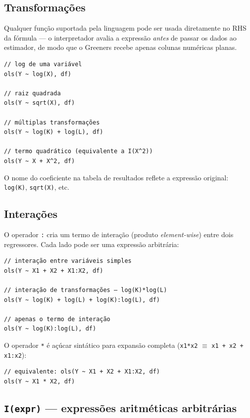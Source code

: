 \subsection{Transformações}
\label{subsec:formula-transformacoes}

Qualquer função suportada pela linguagem pode ser usada diretamente
no RHS da fórmula — o interpretador avalia a expressão
\emph{antes} de passar os dados ao estimador, de modo que o Greeners
recebe apenas colunas numéricas planas.

\begin{lstlisting}[caption={Transformações em regressores}]
// log de uma variável
ols(Y ~ log(X), df)

// raiz quadrada
ols(Y ~ sqrt(X), df)

// múltiplas transformações
ols(Y ~ log(K) + log(L), df)

// termo quadrático (equivalente a I(X^2))
ols(Y ~ X + X^2, df)
\end{lstlisting}

O nome do coeficiente na tabela de resultados reflete a expressão
original: \texttt{log(K)}, \texttt{sqrt(X)}, etc.

\subsection{Interações}
\label{subsec:formula-interacoes}

O operador \texttt{:} cria um termo de interação (produto
\emph{element-wise}) entre dois regressores. Cada lado pode ser uma
expressão arbitrária:

\begin{lstlisting}[caption={Interações}]
// interação entre variáveis simples
ols(Y ~ X1 + X2 + X1:X2, df)

// interação de transformações — log(K)*log(L)
ols(Y ~ log(K) + log(L) + log(K):log(L), df)

// apenas o termo de interação
ols(Y ~ log(K):log(L), df)
\end{lstlisting}

O operador \texttt{*} é açúcar sintático para expansão completa
(\texttt{x1*x2} $\equiv$ \texttt{x1 + x2 + x1:x2}):

\begin{lstlisting}
// equivalente: ols(Y ~ X1 + X2 + X1:X2, df)
ols(Y ~ X1 * X2, df)
\end{lstlisting}

\subsection{\texttt{I(expr)} — expressões aritméticas arbitrárias}
\label{subsec:formula-I}

